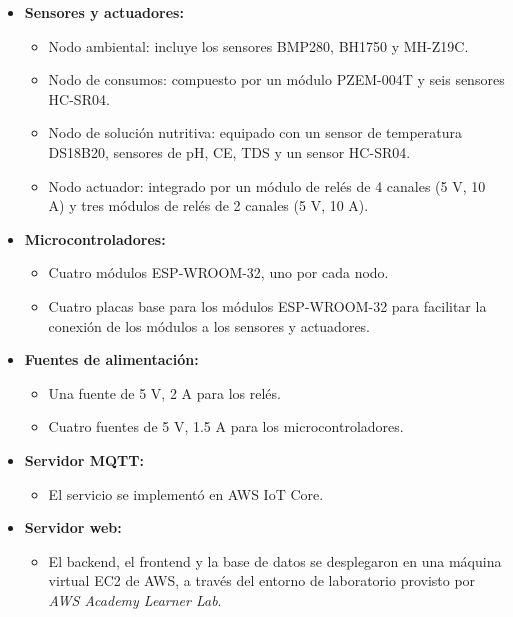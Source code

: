 \begin{itemize}
    \item \textbf{Sensores y actuadores:}
          \begin{itemize}
              \item Nodo ambiental: incluye los sensores BMP280, BH1750 y MH-Z19C.
              \item Nodo de consumos: compuesto por un módulo PZEM-004T y seis sensores HC-SR04.
              \item Nodo de solución nutritiva: equipado con un sensor de temperatura DS18B20,
                    sensores de pH, CE, TDS y un sensor HC-SR04.
              \item Nodo actuador: integrado por un módulo de relés de 4 canales (5 V, 10 A) y tres
                    módulos de relés de 2 canales (5 V, 10 A).
          \end{itemize}

    \item \textbf{Microcontroladores:}
          \begin{itemize}
              \item Cuatro módulos ESP-WROOM-32, uno por cada nodo.
              \item Cuatro placas base \cite{PlacaBaseESP32} para los módulos ESP-WROOM-32 para
                    facilitar la conexión de los módulos a los sensores y actuadores.
          \end{itemize}

    \item \textbf{Fuentes de alimentación:}
          \begin{itemize}
              \item Una fuente de 5 V, 2 A para los relés.
              \item Cuatro fuentes de 5 V, 1.5 A para los microcontroladores.
          \end{itemize}

    \item \textbf{Servidor MQTT:}
          \begin{itemize}
              \item El servicio se implementó en AWS IoT Core.
          \end{itemize}

    \item \textbf{Servidor web:}
          \begin{itemize}
              \item El backend, el frontend y la base de datos se desplegaron en una máquina
                    virtual EC2 de AWS, a través del entorno de laboratorio provisto por
                    \textit{AWS Academy Learner Lab}.
          \end{itemize}
\end{itemize}

